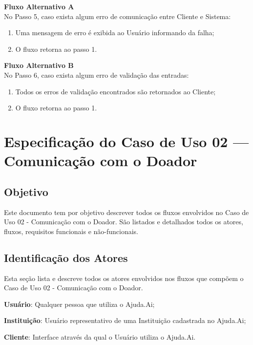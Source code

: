 \begin{anexosenv}
\begin{lista}
    \textbf{Fluxo Alternativo A} \\
    No Passo 5, caso exista algum erro de comunicação entre Cliente e Sistema:
    \begin{enumerate}
    \item Uma mensagem de erro é exibida ao Usuário informando da falha;
    \item O fluxo retorna ao passo 1.
    \end{enumerate}
    
    \textbf{Fluxo Alternativo B} \\
    No Passo 6, caso exista algum erro de validação das entradas:
    \begin{enumerate}
    \item Todos os erros de validação encontrados são retornados ao Cliente;
    \item O fluxo retorna ao passo 1.
    \end{enumerate}
\end{lista}
\pagebreak

\section*{Especificação do Caso de Uso 02 --- Comunicação com o Doador}
\subsection*{Objetivo}
Este documento tem por objetivo descrever todos os fluxos envolvidos no Caso de Uso 02 - Comunicação com o Doador. São listados e detalhados todos os atores, fluxos, requisitos funcionais e não-funcionais.

\subsection*{Identificação dos Atores}
Esta seção lista e descreve todos os atores envolvidos nos fluxos que compõem o Caso de Uso 02 - Comunicação com o Doador.
\begin{lista}
  \item \textbf{Usuário}: Qualquer pessoa que utiliza o Ajuda.Ai;
  \item \textbf{Instituição}: Usuário representativo de uma Instituição cadastrada no Ajuda.Ai;
  \item \textbf{Cliente}: Interface através da qual o Usuário utiliza o Ajuda.Ai.
\end{lista}


\end{anexosenv}
